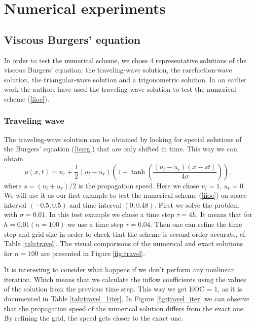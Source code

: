 \documentclass[../include.tex]{subfiles}
\begin{document}
\chapter{Numerical experiments}
\section{Viscous Burgers' equation}
In order to test the numerical scheme, we chose 4 representative solutions of the viscous Burgers' equation:
the traveling-wave solution, the rarefaction-wave solution, the triangular-wave solution and a trigonometric solution. In an earlier work \cite{iioe0} the authors have used the traveling-wave solution to test the numerical scheme (\ref{iioe}).\\
\subsection{Traveling wave}
The traveling-wave solution can be obtained by looking for special solutions of the Burgers' equation (\ref{burg}) that are only shifted in time. This way we can obtain
\begin{equation}
	u(x,t) = u_r + \frac{1}{2}(u_l-u_r)\left(1-\tanh \left(\frac{(u_l-u_r)(x-st)}{4 \sigma}\right) \right),
	\label{travel}
\end{equation}
where $ s = (u_l + u_r)/2 $ is the propagation speed. Here we chose $ u_l = 1,\,u_r = 0 $. We will use it as our first example to test the numerical scheme (\ref{iioe}) on space interval $ (-0.5, 0.5) $ and time interval $ (0, 0.48) $.
First we solve the problem with $ \sigma = 0.01 $.
In this test example we chose a time step $ \tau = 4h $. It means that for $ h = 0.01 (n = 100) $ we use a time step $ \tau = 0.04 $. Then one can refine the time step and grid size in order to check that the scheme is second order accurate, cf. Table \ref{tab:travel}. The visual comparisons of the numerical and exact solutions for $ n = 100 $ are presented in Figure \ref{fig:travel}.

It is interesting to consider what happens if we don't perform any nonlinear iteration. Which means that we calculate the inflow coefficients using the values of the solution from the previous time step. This way we get EOC = 1, as it is documented in Table \ref{tab:travel_1iter}. In Figure \ref{fig:travel_iter} we can observe that the propagation speed of the numerical solution differs from the exact one. By refining the grid, the speed gets closer to the exact one.
\end{document}
